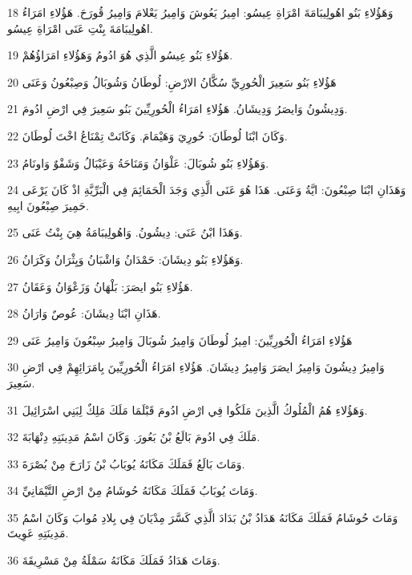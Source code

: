 \par 18 وَهَؤُلاءِ بَنُو اهُولِيبَامَةَ امْرَاةِ عِيسُو: امِيرُ يَعُوشَ وَامِيرُ يَعْلامَ وَامِيرُ قُورَحَ. هَؤُلاءِ امَرَاءُ اهُولِيبَامَةَ بِنْتِ عَنَى امْرَاةِ عِيسُو.
\par 19 هَؤُلاءِ بَنُو عِيسُو الَّذِي هُوَ ادُومُ وَهَؤُلاءِ امَرَاؤُهُمْ.
\par 20 هَؤُلاءِ بَنُو سَعِيرَ الْحُورِيِّ سُكَّانُ الارْضِ: لُوطَانُ وَشُوبَالُ وَصِبْعُونُ وَعَنَى
\par 21 وَدِيشُونُ وَايصَرُ وَدِيشَانُ. هَؤُلاءِ امَرَاءُ الْحُورِيِّينَ بَنُو سَعِيرَ فِي ارْضِ ادُومَ.
\par 22 وَكَانَ ابْنَا لُوطَانَ: حُورِيَ وَهَيْمَامَ. وَكَانَتْ تِمْنَاعُ اخْتَ لُوطَانَ.
\par 23 وَهَؤُلاءِ بَنُو شُوبَالَ: عَلْوَانُ وَمَنَاحَةُ وَعَيْبَالُ وَشَفْوٌ وَاونَامُ.
\par 24 وَهَذَانِ ابْنَا صِبْعُونَ: ايَّةُ وَعَنَى. هَذَا هُوَ عَنَى الَّذِي وَجَدَ الْحَمَائِمَ فِي الْبَرِّيَّةِ اذْ كَانَ يَرْعَى حَمِيرَ صِبْعُونَ ابِيهِ.
\par 25 وَهَذَا ابْنُ عَنَى: دِيشُونُ. وَاهُولِيبَامَةُ هِيَ بِنْتُ عَنَى.
\par 26 وَهَؤُلاءِ بَنُو دِيشَانَ: حَمْدَانُ وَاشْبَانُ وَيِثْرَانُ وَكَرَانُ.
\par 27 هَؤُلاءِ بَنُو ايصَرَ: بَلْهَانُ وَزَعْوَانُ وَعَقَانُ.
\par 28 هَذَانِ ابْنَا دِيشَانَ: عُوصٌ وَارَانُ.
\par 29 هَؤُلاءِ امَرَاءُ الْحُورِيِّينَ: امِيرُ لُوطَانَ وَامِيرُ شُوبَالَ وَامِيرُ سِبْعُونَ وَامِيرُ عَنَى
\par 30 وَامِيرُ دِيشُونَ وَامِيرُ ايصَرَ وَامِيرُ دِيشَانَ. هَؤُلاءِ امَرَاءُ الْحُورِيِّينَ بِامَرَائِهِمْ فِي ارْضِ سَعِيرَ.
\par 31 وَهَؤُلاءِ هُمُ الْمُلُوكُ الَّذِينَ مَلَكُوا فِي ارْضِ ادُومَ قَبْلَمَا مَلَكَ مَلِكٌ لِبَنِي اسْرَائِيلَ.
\par 32 مَلَكَ فِي ادُومَ بَالَعُ بْنُ بَعُورَ. وَكَانَ اسْمُ مَدِينَتِهِ دِنْهَابَةَ.
\par 33 وَمَاتَ بَالَعُ فَمَلَكَ مَكَانَهُ يُوبَابُ بْنُ زَارَحَ مِنْ بُصْرَةَ.
\par 34 وَمَاتَ يُوبَابُ فَمَلَكَ مَكَانَهُ حُوشَامُ مِنْ ارْضِ التَّيْمَانِيِّ.
\par 35 وَمَاتَ حُوشَامُ فَمَلَكَ مَكَانَهُ هَدَادُ بْنُ بَدَادَ الَّذِي كَسَّرَ مِدْيَانَ فِي بِلادِ مُوابَ وَكَانَ اسْمُ مَدِينَتِهِ عَوِيتَ.
\par 36 وَمَاتَ هَدَادُ فَمَلَكَ مَكَانَهُ سَمْلَةُ مِنْ مَسْرِيقَةَ.
